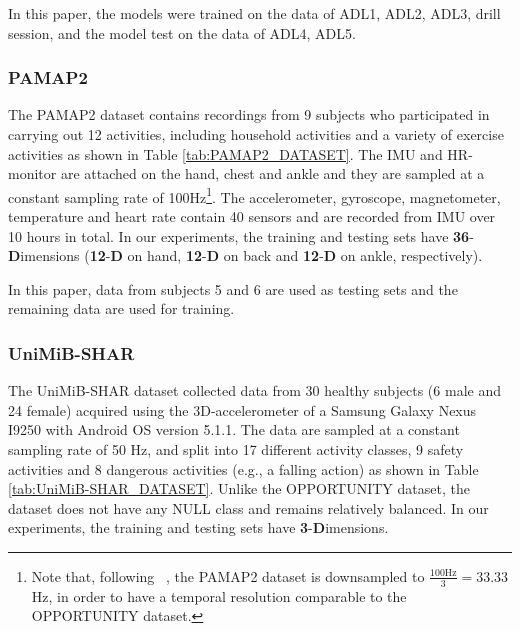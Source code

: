 \documentclass[twoside,twocolumn]{article}
\begin{document}
In this paper, the models were trained on the data of ADL1, ADL2, ADL3, drill session, and the model test on the data of ADL4, ADL5.

\subsubsection{PAMAP2}
The PAMAP2 dataset contains recordings from 9 subjects who participated in carrying out 12 activities, including household activities and a variety of exercise activities as shown in Table \ref{tab:PAMAP2_DATASET}. The IMU and HR-monitor are attached on the hand, chest and ankle and they are sampled at a constant sampling rate of 100Hz\footnote{Note that, following ~\cite{b26}, the PAMAP2 dataset is downsampled to $\frac{100\text{Hz}}{3}=33.33$Hz, in order to have a temporal resolution comparable to the OPPORTUNITY dataset.}. The accelerometer, gyroscope, magnetometer, temperature and heart rate contain 40 sensors and are recorded from IMU over 10 hours in total. In our experiments, the training and testing sets have \textbf{36}-\textbf{D}imensions (\textbf{12}-\textbf{D} on hand, \textbf{12}-\textbf{D} on back and \textbf{12}-\textbf{D} on ankle, respectively).

In this paper, data from subjects 5 and 6 are used as testing sets and the remaining data are used for training.

\subsubsection{UniMiB-SHAR}
The UniMiB-SHAR dataset collected data from 30 healthy subjects (6 male and 24 female) acquired using the 3D-accelerometer of a Samsung Galaxy Nexus I9250 with Android OS version 5.1.1. The data are sampled at a constant sampling rate of 50 Hz, and split into 17 different activity classes, 9 safety activities and 8 dangerous activities (e.g., a falling action) as shown in Table \ref{tab:UniMiB-SHAR_DATASET}. Unlike the OPPORTUNITY dataset, the dataset does not have any NULL class and remains relatively balanced. In our experiments, the training and testing sets have \textbf{3}-\textbf{D}imensions.
\end{document}
